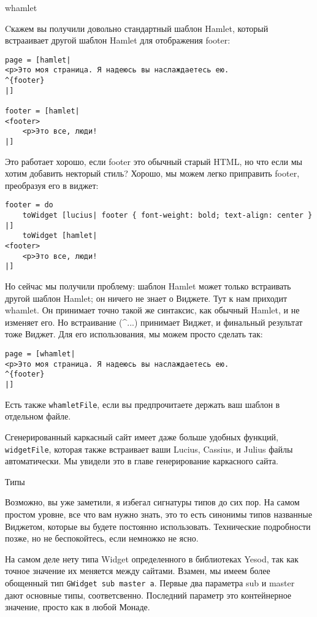 whamlet

Cкажем вы получили довольно стандартный шаблон Hamlet, который встрааивает другой шаблон Hamlet для отображения footer:

\begin{lstlisting}
page = [hamlet|
<p>Это моя страница. Я надеюсь вы наслаждаетесь ею.
^{footer}
|]

footer = [hamlet|
<footer>
    <p>Это все, люди!
|]
\end{lstlisting}

Это работает хорошо, если footer это обычный старый HTML, но что если мы хотим добавить некторый стиль? Хорошо, мы можем легко приправить footer, преобразуя его в виджет:

\begin{lstlisting}
footer = do
    toWidget [lucius| footer { font-weight: bold; text-align: center } |]
    toWidget [hamlet|
<footer>
    <p>Это все, люди!
|]
\end{lstlisting}

Но сейчас мы получили проблему: шаблон Hamlet может только встраивать другой шаблон Hamlet; он ничего не знает о Виджете. Тут к нам приходит whamlet. Он принимает точно такой же синтаксис, как обычный Hamlet, и не изменяет его. Но встраивание (^{...}) принимает Виджет, и финальный результат тоже Виджет. Для его использования, мы можем просто сделать так:

\begin{lstlisting}
page = [whamlet|
<p>Это моя страница. Я надеюсь вы наслаждаетесь ею.
^{footer}
|]
\end{lstlisting}


Есть также \lstinline'whamletFile', если вы предпрочитаете держать ваш шаблон в отдельном файле.

Сгенерированный каркасный сайт имеет даже больше удобных функций, \lstinline'widgetFile', которая также встраивает ваши Lucius, Cassius, и Julius файлы автоматически. Мы увидели это в главе генерирование каркасного сайта. %

Типы
    
Возможно, вы уже заметили, я избегал сигнатуры типов до сих пор. На самом простом уровне, все что вам нужно знать, это то есть синонимы типов названные Виджетом, которые вы будете постоянно использовать. Технические подробности позже, но не беспокойтесь, если немножко не ясно.

На самом деле нету типа Widget определенного в библиотеках Yesod, так как точное значение их меняется между сайтами. Взамен, мы имеем более обощенный тип \lstinline'GWidget sub master a'. Первые два параметра sub и master дают основные типы, соответсвенно. Последний параметр это контейнерное значение, просто как в любой Монаде.

